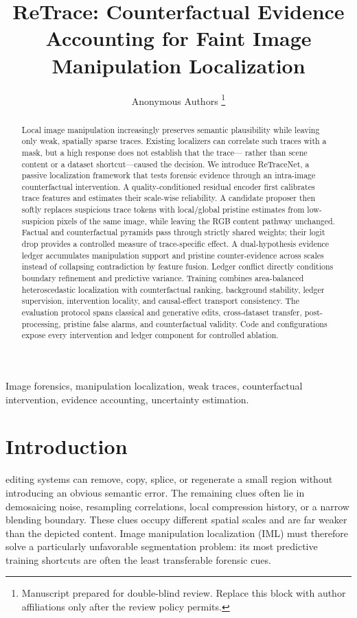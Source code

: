\documentclass[journal]{IEEEtran}
\title{ReTrace: Counterfactual Evidence Accounting for Faint Image Manipulation Localization}
\author{Anonymous Authors%
\thanks{Manuscript prepared for double-blind review. Replace this block with author affiliations only after the review policy permits.}}
\newcommand{\method}{ReTraceNet}
\begin{document}
\maketitle

\begin{abstract}
Local image manipulation increasingly preserves semantic plausibility while
leaving only weak, spatially sparse traces. Existing localizers can correlate
such traces with a mask, but a high response does not establish that the trace---
rather than scene content or a dataset shortcut---caused the decision. We
introduce \method, a passive localization framework that tests forensic evidence
through an intra-image counterfactual intervention. A quality-conditioned
residual encoder first calibrates trace features and estimates their scale-wise
reliability. A candidate proposer then softly replaces suspicious trace tokens
with local/global pristine estimates from low-suspicion pixels of the same image,
while leaving the RGB content pathway unchanged. Factual and counterfactual
pyramids pass through strictly shared weights; their logit drop provides a
controlled measure of trace-specific effect. A dual-hypothesis evidence ledger
accumulates manipulation support and pristine counter-evidence across scales
instead of collapsing contradiction by feature fusion. Ledger conflict directly
conditions boundary refinement and predictive variance. Training combines
area-balanced heteroscedastic localization with counterfactual ranking, background
stability, ledger supervision, intervention locality, and causal-effect transport
consistency. The evaluation protocol spans classical and generative edits,
cross-dataset transfer, post-processing, pristine false alarms, and counterfactual
validity. \ResultSummary Code and configurations expose every intervention and
ledger component for controlled ablation.
\end{abstract}

\begin{IEEEkeywords}
Image forensics, manipulation localization, weak traces, counterfactual
intervention, evidence accounting, uncertainty estimation.
\end{IEEEkeywords}

\section{Introduction}
 editing systems can remove, copy, splice, or regenerate a
small region without introducing an obvious semantic error.  The remaining clues
often lie in demosaicing noise, resampling correlations, local compression
history, or a narrow blending boundary.  These clues occupy different spatial
scales and are far weaker than the depicted content.  Image manipulation
localization (IML) must therefore solve a particularly unfavorable segmentation
problem: its most predictive training shortcuts are often the least transferable
forensic cues.
\end{document}
